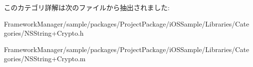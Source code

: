 このカテゴリ詳解は次のファイルから抽出されました\+:\begin{DoxyCompactItemize}
\item 
Framework\+Manager/sample/packages/\+Project\+Package/i\+O\+S\+Sample/\+Libraries/\+Categories/N\+S\+String+\+Crypto.\+h\item 
Framework\+Manager/sample/packages/\+Project\+Package/i\+O\+S\+Sample/\+Libraries/\+Categories/N\+S\+String+\+Crypto.\+m\end{DoxyCompactItemize}
